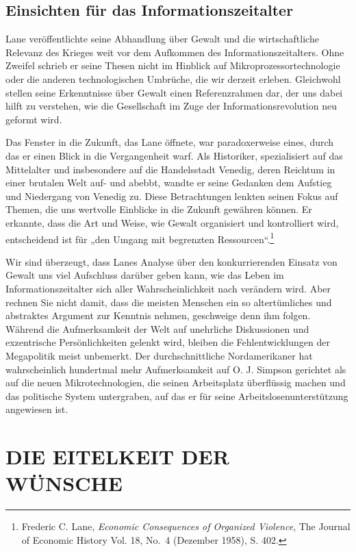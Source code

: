 \documentclass[
  a5paper,
  smalldemyvopaper,10pt,twoside,onecolumn,openright,extrafontsizes,hidelinks]{memoir}
\begin{document}
\subsection{Einsichten für das
Informationszeitalter}\label{einsichten-fuxfcr-das-informationszeitalter}

Lane veröffentlichte seine Abhandlung über Gewalt und die
wirtschaftliche Relevanz des Krieges weit vor dem Aufkommen des
Informationszeitalters. Ohne Zweifel schrieb er seine Thesen nicht im
Hinblick auf Mikroprozessortechnologie oder die anderen technologischen
Umbrüche, die wir derzeit erleben. Gleichwohl stellen seine Erkenntnisse
über Gewalt einen Referenzrahmen dar, der uns dabei hilft zu verstehen,
wie die Gesellschaft im Zuge der Informationsrevolution neu geformt
wird.

Das Fenster in die Zukunft, das Lane öffnete, war paradoxerweise eines,
durch das er einen Blick in die Vergangenheit warf. Als Historiker,
spezialisiert auf das Mittelalter und insbesondere auf die Handelsstadt
Venedig, deren Reichtum in einer brutalen Welt auf- und abebbt, wandte
er seine Gedanken dem Aufstieg und Niedergang von Venedig zu. Diese
Betrachtungen lenkten seinen Fokus auf Themen, die uns wertvolle
Einblicke in die Zukunft gewähren können. Er erkannte, dass die Art und
Weise, wie Gewalt organisiert und kontrolliert wird, entscheidend ist
für „den Umgang mit begrenzten Ressourcen``.\footnote{Frederic C. Lane,
  \emph{Economic Consequences of Organized Violence}, The Journal of
  Economic History Vol. 18, No.~4 (Dezember 1958), S. 402.}

Wir sind überzeugt, dass Lanes Analyse über den konkurrierenden Einsatz
von Gewalt uns viel Aufschluss darüber geben kann, wie das Leben im
Informationszeitalter sich aller Wahrscheinlichkeit nach verändern wird.
Aber rechnen Sie nicht damit, dass die meisten Menschen ein so
altertümliches und abstraktes Argument zur Kenntnis nehmen, geschweige
denn ihm folgen. Während die Aufmerksamkeit der Welt auf unehrliche
Diskussionen und exzentrische Persönlichkeiten gelenkt wird, bleiben die
Fehlentwicklungen der Megapolitik meist unbemerkt. Der durchschnittliche
Nordamerikaner hat wahrscheinlich hundertmal mehr Aufmerksamkeit auf O.
J. Simpson gerichtet als auf die neuen Mikrotechnologien, die seinen
Arbeitsplatz überflüssig machen und das politische System untergraben,
auf das er für seine Arbeitslosenunterstützung angewiesen ist.

\section{DIE EITELKEIT DER WÜNSCHE}\label{die-eitelkeit-der-wuxfcnsche}
\end{document}
